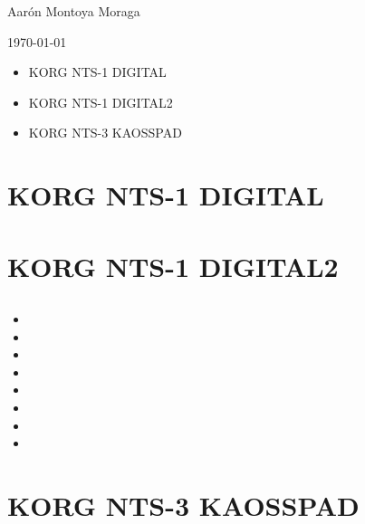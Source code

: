 
\begin{titlepage}
	\centering
	\vspace{1cm}
	\vspace{1.5cm}
    \vfill
	{\huge\bfseries \docTitle\par}
	\vspace{2cm}
	{\Large Aarón Montoya Moraga\par}
    \vfill
	{\large \today\par}
\end{titlepage}

\introText

\introListHeader

\begin{itemize}
    \item KORG NTS-1 DIGITAL
    \item KORG NTS-1 DIGITAL2
    \item KORG NTS-3 KAOSSPAD
\end{itemize}

\section{KORG NTS-1 DIGITAL}

\newpage

\section{KORG NTS-1 DIGITAL2}

\subsection{\subsectionCharacterizationTitle}

\characterizationText

\subsection{\subsectionInterfaceTitle}

\interfaceListHeader

\begin{itemize}
    \item \interfaceItemScreen
    \item \interfaceItemEncoder
    \item \interfaceItemPotA
    \item \interfaceItemPotB
    \item \interfaceItemButtonsOsc
    \item \interfaceItemButtonsMod
    \item \interfaceItemButtonsSeq
    \item \interfaceItemKeyboard
\end{itemize}

\newpage

\section{KORG NTS-3 KAOSSPAD}